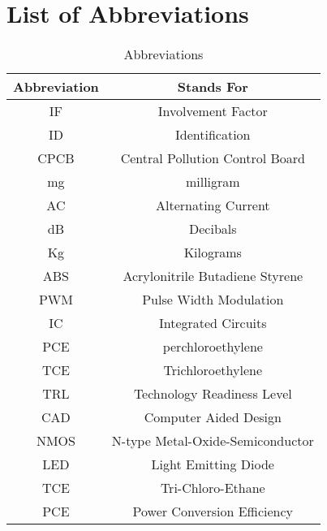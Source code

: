 \documentclass[table]{rapportCS}
\begin{document}
\section{List of Abbreviations}\label{sec:abbrevations}
   \begin{table}[h]
      \centering
      \begin{tabular}{|c|c|}
        \hline
        \textbf{Abbreviation} & \textbf{Stands For} \\
        \hline
        IF & Involvement Factor \\
        \hline
        ID & Identification \\
        \hline
        CPCB & Central Pollution Control Board \\
        \hline
        mg & milligram \\
        \hline
        AC & Alternating Current \\
        \hline
        dB & Decibals \\
        \hline
        Kg & Kilograms \\
        \hline
        ABS & Acrylonitrile Butadiene Styrene \\
        \hline
        PWM & Pulse Width Modulation \\
        \hline
        IC & Integrated Circuits \\
        \hline
        PCE & perchloroethylene \\
        \hline
        TCE & Trichloroethylene \\
        \hline
        TRL & Technology Readiness Level \\
        \hline
        CAD & Computer Aided Design \\
        \hline
        NMOS & N-type Metal-Oxide-Semiconductor
 \\
        \hline
        LED & Light Emitting Diode \\
        \hline
        TCE & Tri-Chloro-Ethane \\
        \hline
        PCE & Power Conversion Efficiency \\
        \hline
      \end{tabular}
      \caption{Abbreviations}
      \label{tab:abbreviations}
    \end{table}
\end{document}
